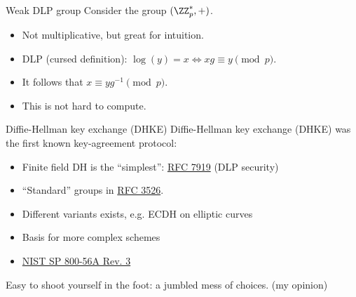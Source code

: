 \begin{frame}{Weak DLP group}
  Consider the group $(\ZZ_p^*, +)$.
  \begin{itemize}[<+(1)->]
    \item Not multiplicative, but great for intuition.
    \item DLP (cursed definition): $\log(y) = x \iff xg \equiv y \pmod{p}$.
    \item It follows that $x \equiv yg^{-1} \pmod{p}$.
    \item This is not hard to compute.
  \end{itemize}
\end{frame}

\begin{frame}{Diffie-Hellman key exchange (DHKE)}
  Diffie-Hellman key exchange (DHKE) was the first known key-agreement protocol:
  \begin{itemize}[<+(1)->]
    \item Finite field DH is the \enquote{simplest}: \href{https://datatracker.ietf.org/doc/html/rfc7919}{RFC 7919} (DLP security)
    \item \enquote{Standard} groups in \href{https://datatracker.ietf.org/doc/html/rfc3526}{RFC 3526}.
    \item Different variants exists, e.g. ECDH on elliptic curves
    \item Basis for more complex schemes
    \item \href{https://csrc.nist.gov/pubs/sp/800/56/a/r3/final}{NIST SP 800-56A Rev. 3}
  \end{itemize}

  \pause
  Easy to shoot yourself in the foot: a jumbled mess of choices. (my opinion)
\end{frame}

